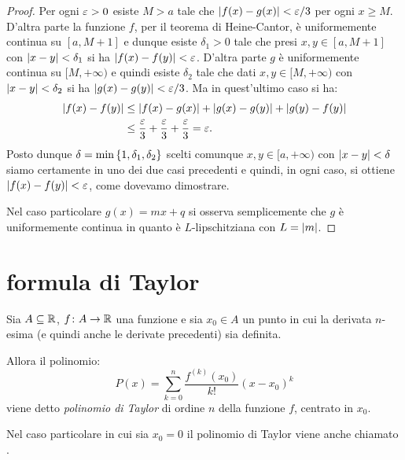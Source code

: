 \begin{proof}
Per ogni $\varepsilon>0$ esiste $M>a$ tale che ${\left|f(x)-g(x)\right|} < \varepsilon/3$ per ogni $x\ge M$. D'altra parte la funzione $f$, per il teorema di Heine-Cantor, è uniformemente continua su $[a,M+1]$ e dunque esiste $\delta_1>0$ tale che presi $x,y \in [a,M+1]$ con ${\left|x-y\right|}< \delta_1$
si ha ${\left|f(x)-f(y)\right|} < \varepsilon$. D'altra parte $g$ è uniformemente continua su $[M,+\infty)$ e quindi esiste $\delta_2$ tale che dati $x,y\in [M,+\infty)$ con ${\left|x-y\right|} < \delta_2$ si ha ${\left|g(x)-g(y)\right|} < \varepsilon/3$. Ma in quest'ultimo caso si ha:
\begin{align*}
  {\left|f(x)-f(y)\right|} &\le {\left|f(x) - g(x)\right|} + {\left|g(x) - g(y)\right|} + {\left|g(y)-f(y)\right|} \\
  & \le \frac{\varepsilon}{3} + \frac{\varepsilon}{3} + \frac{\varepsilon}{3} = \varepsilon.
\end{align*}
Posto dunque $\delta = \min{\left\{ 1, \delta_1, \delta_2 \right\}}$
scelti comunque $x,y\in [a,+\infty)$ con ${\left|x-y\right|}< \delta$ siamo certamente in uno dei due casi precedenti e quindi, in ogni caso, si ottiene ${\left|f(x)-f(y)\right|} < \varepsilon$, come dovevamo dimostrare.

Nel caso particolare $g(x) = mx +q$ si osserva semplicemente che $g$ è uniformemente continua in quanto è $L$-lipschitziana con $L={\left|m\right|}$.
\end{proof}


\section{formula di Taylor}


\begin{definition}
\mymark{***}
Sia $A\subseteq \mathbb R$, $f\colon A \to \mathbb R$ una funzione
e sia $x_0\in A$ un punto in cui la derivata $n$-esima
(e quindi anche le derivate precedenti) sia definita.

Allora il polinomio:
\[
  P(x) = \sum_{k=0}^n \frac{f^{(k)}(x_0)}{k!}(x-x_0)^k
\]
viene detto \emph{polinomio di Taylor}
%
%
di ordine $n$
della funzione $f$,
centrato in $x_0$.
\end{definition}

Nel caso particolare in cui sia $x_0=0$ il polinomio di Taylor viene anche chiamato .

